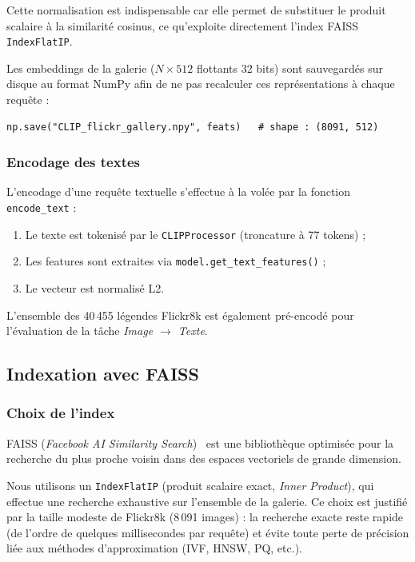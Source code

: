 \documentclass[a4paper,11pt]{article}
\begin{document}
Cette normalisation est indispensable car elle permet de substituer le
produit scalaire à la similarité cosinus, ce qu'exploite directement
l'index FAISS \texttt{IndexFlatIP}.
 
Les embeddings de la galerie ($N \times 512$ flottants 32 bits) sont
sauvegardés sur disque au format NumPy afin de ne pas recalculer ces
représentations à chaque requête :
 
\begin{verbatim}
np.save("CLIP_flickr_gallery.npy", feats)   # shape : (8091, 512)
\end{verbatim}
 
\subsubsection{Encodage des textes}
 
L'encodage d'une requête textuelle s'effectue à la volée par la fonction
\texttt{encode\_text} :
 
\begin{enumerate}
    \item Le texte est tokenisé par le \texttt{CLIPProcessor} (troncature à
          77 tokens) ;
    \item Les features sont extraites via \texttt{model.get\_text\_features()} ;
    \item Le vecteur est normalisé L2.
\end{enumerate}
 
L'ensemble des 40\,455 légendes Flickr8k est également pré-encodé
pour l'évaluation de la tâche \textit{Image $\rightarrow$ Texte}.
 
\subsection{Indexation avec FAISS}
 
\subsubsection{Choix de l'index}
 
FAISS (\textit{Facebook AI Similarity Search})~\cite{johnson2019faiss}
est une bibliothèque optimisée pour la recherche du plus proche voisin
dans des espaces vectoriels de grande dimension.
 
Nous utilisons un \texttt{IndexFlatIP} (produit scalaire exact, \textit{Inner Product}),
qui effectue une recherche exhaustive sur l'ensemble de la galerie.
Ce choix est justifié par la taille modeste de Flickr8k (8\,091 images) :
la recherche exacte reste rapide (de l'ordre de quelques millisecondes
par requête) et évite toute perte de précision liée aux méthodes
d'approximation (IVF, HNSW, PQ, etc.).
 
\end{document}
